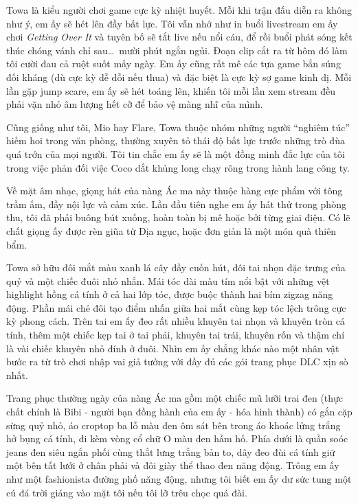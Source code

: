 \documentclass[../main.tex]{subfiles}
\begin{document}
Towa là kiểu người chơi game cực kỳ nhiệt huyết. Mỗi khi trận đấu diễn ra không như ý, em ấy sẽ hét lên đầy bất lực. Tôi vẫn nhớ như in buổi livestream em ấy chơi \textit{Getting Over It} và tuyên bố sẽ tắt live nếu nổi cáu, để rồi buổi phát sóng kết thúc chóng vánh chỉ sau\dots\ mười phút ngắn ngủi. Đoạn clip cắt ra từ hôm đó làm tôi cười đau cả ruột suốt mấy ngày. Em ấy cũng rất mê các tựa game bắn súng đối kháng (dù cực kỳ dễ dỗi nếu thua) và đặc biệt là cực kỳ sợ game kinh dị. Mỗi lần gặp jump scare, em ấy sẽ hét toáng lên, khiến tôi mỗi lần xem stream đều phải vặn nhỏ âm lượng hết cỡ để bảo vệ màng nhĩ của mình.

Cũng giống như tôi, Mio hay Flare, Towa thuộc nhóm những người ``nghiêm túc'' hiếm hoi trong văn phòng, thường xuyên tỏ thái độ bất lực trước những trò đùa quá trớn của mọi người. Tôi tin chắc em ấy sẽ là một đồng minh đắc lực của tôi trong việc phản đối việc Coco dắt khủng long chạy rông trong hành lang công ty.

Về mặt âm nhạc, giọng hát của nàng Ác ma này thuộc hàng cực phẩm với tông trầm ấm, đầy nội lực và cảm xúc. Lần đầu tiên nghe em ấy hát thử trong phòng thu, tôi đã phải buông bút xuống, hoàn toàn bị mê hoặc bởi từng giai điệu. Có lẽ chất giọng ấy được rèn giũa từ Địa ngục, hoặc đơn giản là một món quà thiên bẩm.

Towa sở hữu đôi mắt màu xanh lá cây đầy cuốn hút, đôi tai nhọn đặc trưng của quỷ và một chiếc đuôi nhỏ nhắn. Mái tóc dài màu tím nổi bật với những vệt highlight hồng cá tính ở cả hai lớp tóc, được buộc thành hai bím zigzag năng động. Phần mái chẻ đôi tạo điểm nhấn giữa hai mắt cùng kẹp tóc lệch trông cực kỳ phong cách. Trên tai em ấy đeo rất nhiều khuyên tai nhọn và khuyên tròn cá tính, thêm một chiếc kẹp tai ở tai phải, khuyên tai trái, khuyên rốn và thậm chí là vài chiếc khuyên nhỏ đính ở đuôi. Nhìn em ấy chẳng khác nào một nhân vật bước ra từ trò chơi nhập vai giả tưởng với đầy đủ các gói trang phục DLC xịn sò nhất.

Trang phục thường ngày của nàng Ác ma gồm một chiếc mũ lưỡi trai đen (thực chất chính là Bibi - người bạn đồng hành của em ấy - hóa hình thành) có gắn cặp sừng quỷ nhỏ, áo croptop ba lỗ màu đen ôm sát bên trong áo khoác lửng trắng hở bụng cá tính, đi kèm vòng cổ chữ O màu đen hầm hố. Phía dưới là quần soóc jeans đen siêu ngắn phối cùng thắt lưng trắng bản to, dây đeo đùi cá tính giữ một bên tất lưới ở chân phải và đôi giày thể thao đen năng động. Trông em ấy như một fashionista đường phố năng động, nhưng tôi biết em ấy dư sức tung một cú đá trời giáng vào mặt tôi nếu tôi lỡ trêu chọc quá đài.
\end{document}
